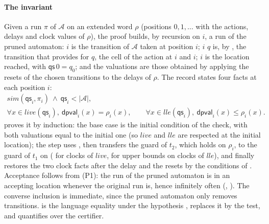 \paragraph{The invariant} Given a run $\pi$ of $\mathcal A$ on an extended word $\rho$ (positions $0,1,\dots$ with the actions, delays and clock values of $\rho$), the proof builds, by recursion on $i$, a run of the pruned automaton:  $i$ is the transition of $\mathcal A$ taken at position $i$;  $i$ $q$ is, by , the transition that  provides for $q$, the cell of the action at $i$ and  $i$;  $i$ is the location reached, with $\mathsf{qs}\,0=q_0$; and the valuations  are those obtained by applying the resets of the chosen transitions to the delays of $\rho$. The record  states four facts at each position $i$:
\begin{gather*}
\mathit{sim}(\mathsf{qs}_i,\pi_i)\ \wedge\ \mathsf{qs}_i<|\mathcal A|,\\
\forall x\in\mathit{live}(\mathsf{qs}_i),\ \mathsf{dpval}_i(x)=\rho_i(x),\qquad \forall x\in\mathit{lle}(\mathsf{qs}_i),\ \mathsf{dpval}_i(x)\le\rho_i(x).
\end{gather*}
 proves it by induction: the base case is the initial condition of the check, with both valuations equal to the initial one (so $\mathit{live}$ and $\mathit{lle}$ are respected at the initial location); the step uses , then transfers the guard of $t_2$, which holds on $\rho_i$, to the guard of $t_1$ on  ( for clocks of $\mathit{live}$,  for upper bounds on clocks of $\mathit{lle}$), and finally restores the two clock facts after the delay and the resets by the conditions of . Acceptance follows from (P1): the run of the pruned automaton is in an accepting location whenever the original run is, hence infinitely often (, ). The converse inclusion is immediate, since the pruned automaton only removes transitions.  is the language equality under the hypothesis ,  replaces it by the test, and  quantifies over the certifier.


